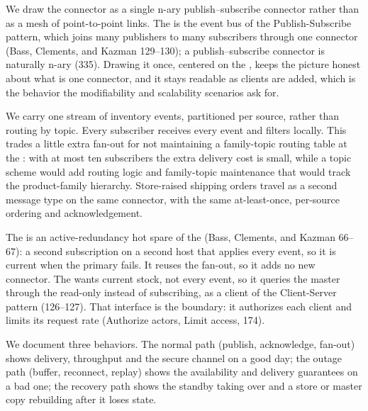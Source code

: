 We draw the \IEP connector as a single n-ary publish--subscribe connector rather than as
a mesh of point-to-point links. The \CFE is the event bus of the Publish-Subscribe
pattern, which joins many publishers to many subscribers through one connector (Bass,
Clements, and Kazman 129--130); a publish--subscribe connector is naturally n-ary (335).
Drawing it once, centered on the \CFE, keeps the picture honest about what is one
connector, and it stays readable as clients are added, which is the behavior the
modifiability and scalability scenarios ask for.

We carry one stream of inventory events, partitioned per source, rather than routing by
topic. Every subscriber receives every event and filters locally. This trades a little
extra fan-out for not maintaining a family-topic routing table at the \CFE: with at most
ten subscribers the extra delivery cost is small, while a topic scheme would add routing
logic and family-topic maintenance that would track the product-family hierarchy.
Store-raised shipping orders travel as a second message type on the same connector, with
the same at-least-once, per-source ordering and acknowledgement.

The \StandbyMaster is an active-redundancy hot spare of the \CentralMasterInventory
(Bass, Clements, and Kazman 66--67): a second subscription on a second \DC host that
applies every event, so it is current when the primary fails. It reuses the fan-out, so it adds
no new connector. The \AnalyticsClient wants current stock, not every event, so it
queries the master through the read-only \InventoryQuery instead of subscribing, as a
client of the Client-Server pattern (126--127). That interface is the boundary: it
authorizes each client and limits its request rate (Authorize actors, Limit access, 174).

We document three behaviors. The normal path (publish, acknowledge, fan-out) shows
delivery, throughput and the secure channel on a good day; the outage path (buffer,
reconnect, replay) shows the availability and delivery guarantees on a bad one; the
recovery path shows the standby taking over and a store or master copy rebuilding after
it loses state.

